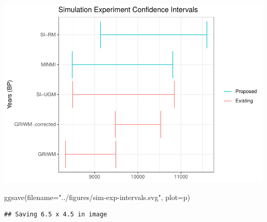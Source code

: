 \documentclass[
]{article}
\newenvironment{Shaded}{\begin{snugshade}}{\end{snugshade}}
\newcommand{\AttributeTok}[1]{\textcolor[rgb]{0.77,0.63,0.00}{#1}}
\newcommand{\FunctionTok}[1]{\textcolor[rgb]{0.00,0.00,0.00}{#1}}
\newcommand{\NormalTok}[1]{#1}
\newcommand{\StringTok}[1]{\textcolor[rgb]{0.31,0.60,0.02}{#1}}
\begin{document}
\includegraphics{sim_exp-results_files/figure-latex/unnamed-chunk-7-1.pdf}

\begin{Shaded}
\begin{Highlighting}[]
\FunctionTok{ggsave}\NormalTok{(}\AttributeTok{filename=}\StringTok{"../figures/sim{-}exp{-}intervals.svg"}\NormalTok{, }\AttributeTok{plot=}\NormalTok{p)}
\end{Highlighting}
\end{Shaded}

\begin{verbatim}
## Saving 6.5 x 4.5 in image
\end{verbatim}
\end{document}
